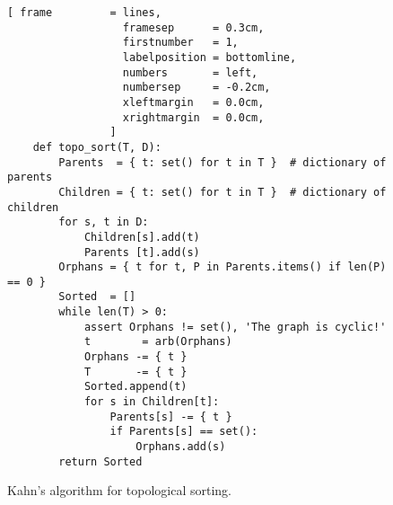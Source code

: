 \begin{figure}[!ht]
\centering
\begin{Verbatim}[ frame         = lines, 
                  framesep      = 0.3cm, 
                  firstnumber   = 1,
                  labelposition = bottomline,
                  numbers       = left,
                  numbersep     = -0.2cm,
                  xleftmargin   = 0.0cm,
                  xrightmargin  = 0.0cm,
                ]
    def topo_sort(T, D):
        Parents  = { t: set() for t in T }  # dictionary of parents
        Children = { t: set() for t in T }  # dictionary of children
        for s, t in D:
            Children[s].add(t)
            Parents [t].add(s)
        Orphans = { t for t, P in Parents.items() if len(P) == 0 }
        Sorted  = []
        while len(T) > 0:
            assert Orphans != set(), 'The graph is cyclic!'
            t        = arb(Orphans)
            Orphans -= { t }
            T       -= { t }
            Sorted.append(t)
            for s in Children[t]:
                Parents[s] -= { t }
                if Parents[s] == set():
                    Orphans.add(s)
        return Sorted
\end{Verbatim}
\vspace*{-0.3cm}
\caption{Kahn's algorithm for topological sorting.}
\label{fig:Topologocal-Sorting.ipynb}
\end{figure}

